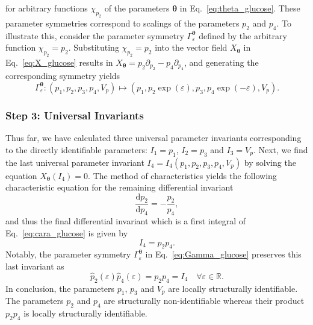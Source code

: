 \documentclass[12pt]{article}
\begin{document}
{for arbitrary functions $\chi_{p_{2}}$ of the parameters $\boldsymbol{\theta}$ in Eq.~\eqref{eq:theta_glucose}. These parameter symmetries correspond to scalings of the parameters $p_{2}$ and $p_{4}$. To illustrate this, consider the parameter symmetry $\Gamma_{\varepsilon}^{\boldsymbol{\theta}}$ defined by the arbitrary function $\chi_{p_{2}}=p_{2}$. Substituting $\chi_{p_{2}}=p_{2}$ into the vector field $X_{\boldsymbol{\theta}}$ in Eq.~\eqref{eq:X_glucose} results in $X_{\boldsymbol{\theta}}=p_{2}\partial_{p_{2}}-p_{4}\partial_{p_{4}}$, and generating the corresponding symmetry yields
\begin{equation}\Gamma_{\varepsilon}^{\boldsymbol{\theta}}:(p_{1},p_{2},p_{3},p_{4},V_{p})\mapsto(p_{1},p_{2}\exp(\varepsilon),p_{3},p_{4}\exp(-\varepsilon),V_{p}).
    \label{eq:Gamma_glucose}
\end{equation}
}


\subsubsection*{Step 3: Universal Invariants}

Thus far, we have calculated three universal parameter invariants corresponding to the directly identifiable parameters: $I_{1}=p_{1}$, $I_{2}=p_{3}$ and $I_{3}=V_{p}$. Next, we find the last universal parameter invariant $I_{4}=I_{4}\left(p_{1},p_{2},p_{3},p_{4},V_{p}\right)$ by solving the equation $X_{\boldsymbol{\theta}}(I_{4})=0$. The method of characteristics yields the following characteristic equation for the remaining differential invariant
\begin{equation}
    \frac{\mathrm{d}p_{2}}{\mathrm{d}p_{4}}=-\frac{p_{2}}{p_{4}},
    \label{eq:cara_glucose}
\end{equation}
and thus the final differential invariant which is a first integral of Eq.~\eqref{eq:cara_glucose} is given by
\begin{equation}
    I_{4}=p_{2}p_{4}.
    \label{eq:invariant_glucose}
\end{equation}
Notably, the parameter symmetry $\Gamma_{\varepsilon}^{\boldsymbol{\theta}}$ in Eq.~\eqref{eq:Gamma_glucose} preserves this last invariant as
\begin{equation}
    \hat{p}_{2}(\varepsilon)\hat{p}_{4}(\varepsilon)=p_{2}p_{4}=I_{4}\quad\forall\varepsilon\in\mathbb{R}.
\end{equation}
In conclusion, the parameters $p_{1}$, $p_{3}$ and $V_{p}$ are locally structurally identifiable. The parameters $p_{2}$ and $p_{4}$ are structurally non-identifiable whereas their product $p_{2}p_{4}$ is locally structurally identifiable.
\end{document}
